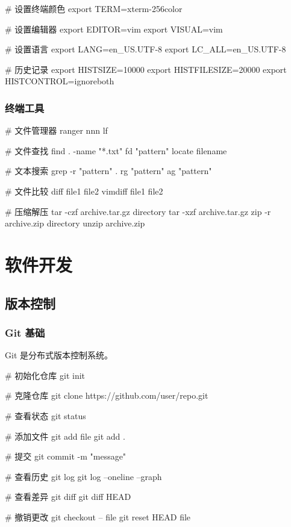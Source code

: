 
\begin{lstcode}[numbers=none]
  # 设置终端颜色
  export TERM=xterm-256color

  # 设置编辑器
  export EDITOR=vim
  export VISUAL=vim

  # 设置语言
  export LANG=en_US.UTF-8
  export LC_ALL=en_US.UTF-8

  # 历史记录
  export HISTSIZE=10000
  export HISTFILESIZE=20000
  export HISTCONTROL=ignoreboth
\end{lstcode}

\subsubsection{终端工具}


\begin{lstcode}[numbers=none]
  # 文件管理器
  ranger
  nnn
  lf

  # 文件查找
  find . -name "*.txt"
  fd "pattern"
  locate filename

  # 文本搜索
  grep -r "pattern" .
  rg "pattern"
  ag "pattern"

  # 文件比较
  diff file1 file2
  vimdiff file1 file2

  # 压缩解压
  tar -czf archive.tar.gz directory
  tar -xzf archive.tar.gz
  zip -r archive.zip directory
  unzip archive.zip
\end{lstcode}

\section{软件开发}

\subsection{版本控制}

\subsubsection{Git 基础}

Git 是分布式版本控制系统。


\begin{lstcode}[numbers=none]
  # 初始化仓库
  git init

  # 克隆仓库
  git clone https://github.com/user/repo.git

  # 查看状态
  git status

  # 添加文件
  git add file
  git add .

  # 提交
  git commit -m "message"

  # 查看历史
  git log
  git log --oneline --graph

  # 查看差异
  git diff
  git diff HEAD

  # 撤销更改
  git checkout -- file
  git reset HEAD file
\end{lstcode}

